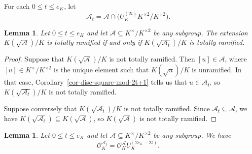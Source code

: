 \documentclass[11pt]{amsart}
\theoremstyle{theorem}
\newtheorem{lemma}[theorem]{Lemma}
\theoremstyle{example}
\theoremstyle{definition}
\numberwithin{theorem}{section}
\numberwithin{theorem}{section}
\newcommand{\co}{\mathcal{O}}
\begin{document}
For each $0 \leq t \leq e_K$, let 
$$
\mathcal{A}_t = \mathcal{A} \cap \big(U_K^{(2t)}K^{\times 2}/K^{\times 2}\big). 
$$
\begin{lemma}
    \label{lem-At-tot-ram-iff-A-tot-ram}
    Let $0 \leq t \leq e_K$ and let $\mathcal{A}\subseteq K^\times / K^{\times 2}$ be any subgroup. The extension $K(\sqrt{\mathcal{A}})/K$ is totally ramified if and only if $K(\sqrt{\mathcal{A}_t})/K$ is totally ramified. 
\end{lemma}
\begin{proof}
    Suppose that $K(\sqrt{\mathcal{A}})/K$ is not totally ramified. Then $[u] \in \mathcal{A}$, where $[u] \in K^\times / K^{\times 2}$ is the unique element such that $K(\sqrt{u})/K$ is unramified. In that case, Corollary~\ref{cor-disc-square-mod-2t+1} tells us that $u \in \mathcal{A}_t$, so $K(\sqrt{\mathcal{A}_t})/K$ is not totally ramified. 

    Suppose conversely that $K(\sqrt{\mathcal{A}_t})/K$ is not totally ramified. Since $\mathcal{A}_t\subseteq \mathcal{A}$, we have $K(\sqrt{\mathcal{A}_t})\subseteq K(\sqrt{\mathcal{A}})$, so $K(\sqrt{\mathcal{A}})$ is not totally ramified. 
\end{proof}
\begin{lemma}
    \label{lem-OKAt-supremum-of-groups}
    Let $0 \leq t \leq e_K$ and let $\mathcal{A}\subseteq K^\times / K^{\times 2}$ be any subgroup. We have 
    $$
    \co_K^{\mathcal{A}_t} = \co_K^{\mathcal{A}}U_K^{(2e_K - 2t)}. 
    $$
\end{lemma}
\end{document}
